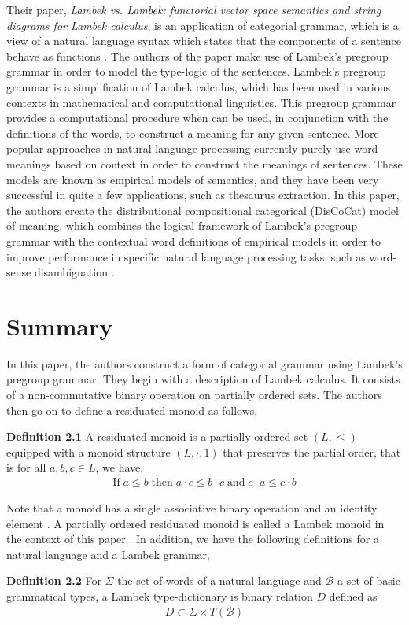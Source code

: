 \documentclass[11pt, reqno]{amsart}
\theoremstyle{plain}
\theoremstyle{definition}
\theoremstyle{example}
\begin{document}
\par
Their paper, \textit{Lambek vs. Lambek: functorial vector space semantics and string diagrams for Lambek calculus}, is an application of categorial grammar, which is a view of a natural language syntax which states that the components of a sentence behave as functions \cite{categorialgrammar}. The authors of the paper make use of Lambek's pregroup grammar in order to model the type-logic of the sentences. Lambek's pregroup grammar is a simplification of Lambek calculus, which has been used in various contexts in mathematical and computational linguistics. This pregroup grammar provides a computational procedure when can be used, in conjunction with the definitions of the words, to construct a meaning for any given sentence. More popular approaches in natural language processing currently purely use word meanings based on context in order to construct the meanings of sentences. These models are known as empirical models of semantics, and they have been very successful in quite a few applications, such as thesaurus extraction. In this paper, the authors create the distributional compositional categorical (DisCoCat) model of meaning, which combines the logical framework of Lambek's pregroup grammar with the contextual word definitions of empirical models in order to improve performance in specific natural language processing tasks, such as word-sense disambiguation \cite{lambekvlambek}.
\newpage
\section{Summary}

In this paper, the authors construct a form of categorial grammar using Lambek's pregroup grammar. They begin with a description of Lambek calculus. It consists of a non-commutative binary operation on partially ordered sets. The authors then go on to define a residuated monoid as follows,

\par
\textbf{Definition 2.1} \cite[\S 2.1]{lambekvlambek} A residuated monoid is a partially ordered set $(L, \leq)$ equipped with a monoid structure $(L, \cdot, 1)$ that preserves the partial order, that is for all $a, b, c \in L$, we have,
\begin{align*}
\text{If} \; a \leq b \; \text{then} \; a \cdot c \leq b \cdot c \; \text{and} \; c \cdot a \leq c \cdot b
\end{align*}

Note that a monoid has a single associative binary operation and an identity element \cite{monoid}. A partially ordered residuated monoid is called a Lambek monoid in the context of this paper \cite[\S 2.1]{lambekvlambek}. In addition, we have the following definitions for a natural language and a Lambek grammar,
\par
\textbf{Definition 2.2} \cite{lambekvlambek} For $\Sigma$ the set of words of a natural language and $\mathcal{B}$ a set of basic grammatical types, a Lambek type-dictionary is binary relation $D$ defined as
\begin{align*}
D \subset \Sigma \times T(\mathcal{B})
\end{align*}
\end{document}
